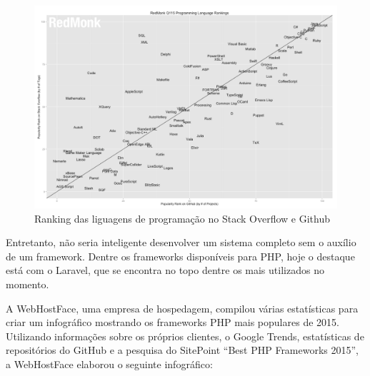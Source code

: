 \begin{figure}
	\label{fig:graficoRedmonk}
	\includegraphics[width=1\textwidth]{img/grafico_redmonk}
	\caption{Ranking das liguagens de programação no Stack Overflow e Github}
\end{figure}


Entretanto, não seria inteligente desenvolver um sistema completo sem o auxílio de um framework. Dentre os frameworks disponíveis para PHP, hoje o destaque está com o Laravel, que se encontra no topo dentre os mais utilizados no momento. 
 

A WebHostFace, uma empresa de hospedagem, compilou várias estatísticas para criar um infográfico mostrando os frameworks PHP mais populares de 2015. Utilizando informações sobre os próprios clientes, o Google Trends, estatísticas de repositórios do GitHub e a pesquisa do SitePoint “Best PHP Frameworks 2015”, a WebHostFace elaborou o seguinte infográfico: %


